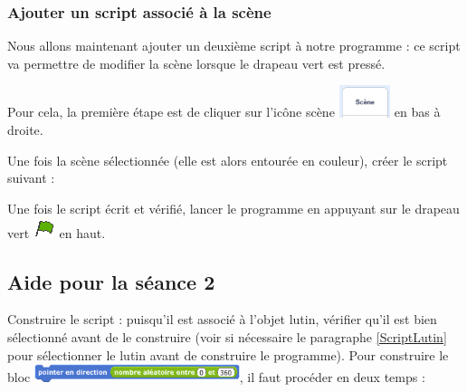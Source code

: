\subsubsection{Ajouter un script associé à la scène}

Nous allons maintenant ajouter un deuxième script à notre programme : ce script va permettre de modifier la scène lorsque le drapeau vert est pressé. 

Pour cela, la première étape est de cliquer sur l'icône scène \includegraphics[width=1.5cm]{./images/scratch/scene0.png} en bas à droite.


Une fois la scène sélectionnée (elle est alors entourée en couleur), créer le script suivant :


Une fois le script écrit et vérifié, lancer le programme en appuyant sur le drapeau vert \includegraphics[width=.7cm]{./images/scratch/DrapeauVert} en haut. 








%
%
%
%









\subsection{Aide pour la séance 2}\label{correction_scratch2}


Construire le script : puisqu'il est associé à l'objet lutin, vérifier qu'il est bien sélectionné avant de le construire (voir si nécessaire le paragraphe \vref{ScriptLutin} pour sélectionner le lutin avant de construire le programme). Pour construire le bloc \includegraphics[width=6cm]{./images/scratch/ScratchActivite23}, il faut procéder en deux temps :

